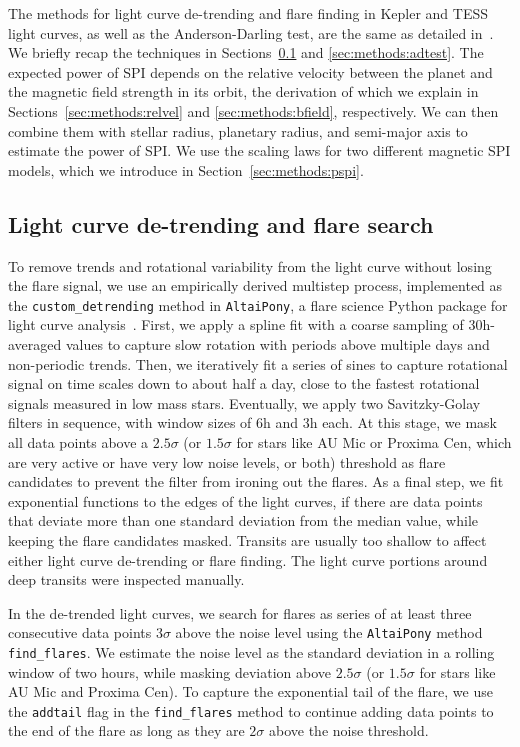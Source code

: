 \documentclass[twocolumn]{aastex631}
\begin{document}
The methods for light curve de-trending and flare finding in Kepler and TESS light curves, as well as the Anderson-Darling test, are the same as detailed in~\citet{ilin2022searching}. We briefly recap the techniques in Sections~\ref{sec:methods:flaresearch} and \ref{sec:methods:adtest}. The expected power of SPI depends on the relative velocity between the planet and the magnetic field strength in its orbit, the derivation of which we explain in 
Sections~\ref{sec:methods:relvel} and \ref{sec:methods:bfield}, respectively. We can then combine them with stellar radius, planetary radius, and semi-major axis to estimate the power of SPI. We use the scaling laws for two different magnetic SPI models, which we introduce in Section~\ref{sec:methods:pspi}.

\subsection{Light curve de-trending and flare search}
\label{sec:methods:flaresearch}
To remove trends and rotational variability from the light curve without losing the flare signal, we use an empirically derived multistep process, implemented as the \texttt{custom\_detrending} method in \texttt{AltaiPony}, a flare science Python package for light curve analysis~\citep{ilin2021altaipony}. First, we apply a spline fit with a coarse sampling of 30h-averaged values to capture slow rotation with periods above multiple days and non-periodic trends. Then, we iteratively fit a series of sines to capture rotational signal on time scales down to about half a day, close to the fastest rotational signals measured in low mass stars. Eventually, we apply two Savitzky-Golay~\citep{savitzky1964smoothing} filters in sequence, with window sizes of 6h and 3h each. At this stage, we mask all data points above a $2.5 \sigma$ (or $1.5 \sigma$ for stars like AU Mic or Proxima Cen, which are very active or have very low noise levels, or both) threshold as flare candidates to prevent the filter from ironing out the flares. As a final step, we fit exponential functions to the edges of the light curves, if there are data points that deviate more than one standard deviation from the median value, while keeping the flare candidates masked. Transits are usually too shallow to affect either light curve de-trending or flare finding. The light curve portions around deep transits were inspected manually.

In the de-trended light curves, we search for flares as series of at least three consecutive data points $3\sigma$ above the noise level using the \texttt{AltaiPony} method \texttt{find\_flares}. We estimate the noise level as the standard deviation in a rolling window of two hours, while masking deviation above $2.5\sigma$ (or $1.5\sigma$  for stars like AU Mic and Proxima Cen). To capture the exponential tail of the flare, we use the \texttt{addtail} flag in the \texttt{find\_flares} method to continue adding data points to the end of the flare as long as they are $2\sigma$ above the noise threshold.
\end{document}
